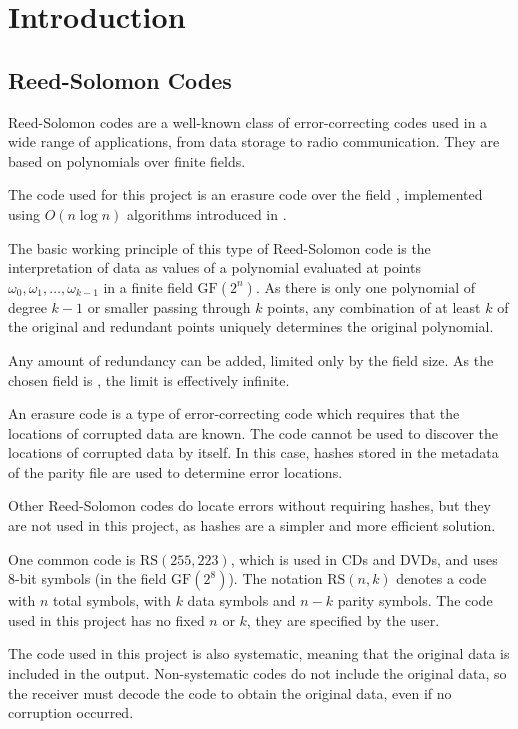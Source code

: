 \chapter{Introduction}

\section{Reed-Solomon Codes}

Reed-Solomon codes are a well-known class of error-correcting codes used in a wide range of applications, from data storage to radio communication.
They are based on polynomials over finite fields. \cite{theory-of-error-correcting-codes}

The code used for this project is an erasure code over the field , implemented using $O(n \log n)$ algorithms introduced in \cite{novel-poly}.

The basic working principle of this type of Reed-Solomon code is the interpretation of data as values of a polynomial evaluated at points ${\omega_0, \omega_1, \ldots, \omega_{k - 1}}$ in a finite field $\text{GF}(2^n)$.
As there is only one polynomial of degree $k - 1$ or smaller passing through $k$ points, any combination of at least $k$ of the original and redundant points uniquely determines the original polynomial.

Any amount of redundancy can be added, limited only by the field size. As the chosen field is , the limit is effectively infinite.

An erasure code is a type of error-correcting code which requires that the locations of corrupted data are known.
The code cannot be used to discover the locations of corrupted data by itself.
In this case, hashes stored in the metadata of the parity file are used to determine error locations.

Other Reed-Solomon codes do locate errors without requiring hashes, but they are not used in this project, as hashes are a simpler and more efficient solution.

One common code is $\text{RS}(255, 223)$, which is used in CDs and DVDs, and uses 8-bit symbols (in the field $\text{GF}(2^8)$).
The notation $\text{RS}(n, k)$ denotes a code with $n$ total symbols, with $k$ data symbols and $n - k$ parity symbols.
The code used in this project has no fixed $n$ or $k$, they are specified by the user.

The code used in this project is also systematic, meaning that the original data is included in the output.
Non-systematic codes do not include the original data, so the receiver must decode the code to obtain the original data, even if no corruption occurred.

